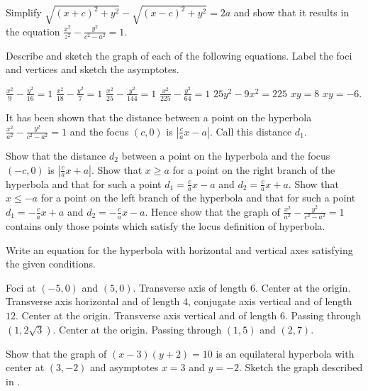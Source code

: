\begin{exercises}

Simplify $\sqrt{(x+c)^2 + y^2} - \sqrt{(x-c)^2 + y^2} = 2a$
and show that it results in the equation
$\frac{x^2}{z^2} - \frac{y^2}{c^2-a^2} = 1$.

Describe and sketch the graph of each of the following equations.
Label the foci and vertices and sketch the asymptotes.
\begin{exenum}
\sx
$\frac{x^2}{9} - \frac{y^2}{16} = 1$
\sx
$\frac{x^2}{18} - \frac{y^2}{7} = 1$
\sx
$\frac{x^2}{25} - \frac{y^2}{144} = 1$
\sx
$\frac{x^2}{225} - \frac{y^2}{64} = 1$
\sx
$25y^2 - 9x^2 = 225$
\sx
$xy = 8$
\sx
$xy = -6$.
\end{exenum}

It has been shown that the distance between a point on
the hyperbola $\frac{x^2}{a^2} - \frac{y^2}{c^2-a^2} = 1$
and the focus $(c,0)$ is $\left| \frac ca x - a \right|$.
Call this distance $d_1$.
\begin{exenum}
\sx
Show that the distance $d_2$ between a point on the
hyperbola and the focus $(-c,0)$ is
$\left| \frac ca x + a \right|$.
\sx
Show that $x \geq a$ for a point on the right branch of
the hyperbola and that for such a point
$d_1 = \frac ca x - a$ and $d_2 = \frac ca x + a$.
\sx
Show that $x \leq -a$ for a point on the left branch of
the hyperbola and that for such a point
$d_1 = -\frac ca x + a$ and $d_2 = -\frac ca x - a$.
\sx
Hence show that the graph of
$\frac{x^2}{a^2} - \frac{y^2}{c^2-a^2} = 1$
contains only those points which satisfy the locus
definition of hyperbola.
\end{exenum}

Write an equation for the hyperbola with horizontal
and vertical axes satisfying the given conditions.
\begin{exenum}
\sx
Foci at $(-5,0)$ and $(5,0)$.
Transverse axis of length $6$.
\sx
Center at the origin.
Transverse axis horizontal and of length $4$,
conjugate axis vertical and of length $12$.
\sx
Center at the origin.
Transverse axis vertical and of length $6$.
Passing through $(1, 2\sqrt3)$.
\sx
Center at the origin.
Passing through $(1,5)$ and $(2,7)$.
\end{exenum}

\begin{exenum}
\sx
{}
Show that the graph of $(x-3)(y+2) = 10$ is an
equilateral hyperbola with center at
$(3,-2)$ and asymptotes $x=3$ and $y=-2$.
\sx
Sketch the graph described in .
\end{exenum}


\end{exercises}
